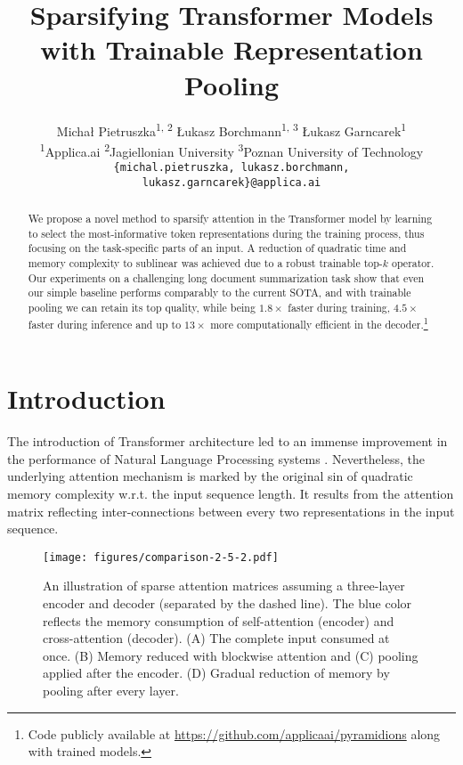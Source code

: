 \documentclass{article}
\title{Sparsifying Transformer Models with Trainable Representation Pooling}
\author{Michał Pietruszka\textsuperscript{1, 2} \quad Łukasz Borchmann\textsuperscript{1, 3} \quad Łukasz Garncarek\textsuperscript{1} \\
  \textsuperscript{1}Applica.ai \quad \textsuperscript{2}Jagiellonian University \quad \textsuperscript{3}Poznan University of Technology \\
  \texttt{\{michal.pietruszka, lukasz.borchmann,}\\ \texttt{lukasz.garncarek\}@applica.ai} \\
}
\begin{document}
\maketitle

\begin{abstract}
We propose a novel method to sparsify attention in the Transformer model by learning to select the most-informative token representations during the training process, thus focusing on the task-specific parts of an input. 
A reduction of quadratic time and memory complexity to sublinear was achieved due to a robust trainable top-$k$ operator.
Our experiments on a challenging long document summarization task show that even our simple baseline performs comparably to the current SOTA, and with trainable pooling we can retain its top quality, while being $1.8\times$ faster during training, $4.5\times$ faster during inference and up to $13\times$ more computationally efficient in the decoder.\footnote{Code publicly available at \url{https://github.com/applicaai/pyramidions} along with trained models.}
\end{abstract}


\section{Introduction}  

The introduction of Transformer architecture led to an immense improvement in the performance of Natural Language Processing systems \citep{Vaswani2017AttentionIA,Radford2018ImprovingLU,Devlin2019BERTPO}. Nevertheless, the underlying attention mechanism is marked by the original sin of quadratic memory complexity w.r.t. the input sequence length. It results from the attention matrix reflecting inter-connections between every two representations in the input sequence.

\begin{figure}
    \centering
        \texttt{[image: figures/comparison-2-5-2.pdf]}
        \caption{
        An illustration of sparse attention matrices assuming a three-layer encoder and decoder (separated by the dashed line). The blue color reflects the memory consumption of self-attention (encoder) and cross-attention (decoder).
        (A) The complete input consumed at once. 
        (B) Memory reduced with blockwise attention and (C) pooling applied after the encoder. (D) Gradual reduction of memory by pooling after every layer.}
        \label{fig:comparison}
\end{figure}
\end{document}
